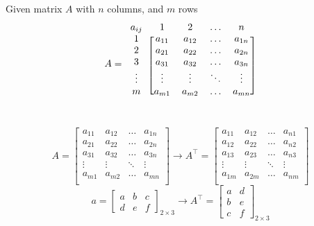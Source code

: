 Given matrix $A$ with $n$ columns, and $m$ rows
\[A=
\begin{blockarray}{ccccc}
a_{ij} & 1 & 2 & \dots  & n \\
\begin{block}{c[cccc]}
  1 & a_{11}  & a_{12}  & \dots & a_{1n}  \\
  2 & a_{21}  & a_{22}  & \dots & a_{2n}  \\
  3 & a_{31}  & a_{32}  & \dots & a_{3n}  \\
  \vdots & \vdots & \vdots & \ddots & \vdots \\
  m & a_{m1}  & a_{m2}  & \dots & a_{mn}  \\
\end{block}
\end{blockarray}
 \]
\\
\[A=
\begin{bmatrix}
   a_{11}  & a_{12}  & \dots & a_{1n}  \\
  a_{21}  & a_{22}  & \dots & a_{2n}  \\
   a_{31}  & a_{32}  & \dots & a_{3n}  \\
   \vdots & \vdots & \ddots & \vdots \\
   a_{m1}  & a_{m2}  & \dots & a_{mn}  \\
\end{bmatrix}
\longrightarrow A^\intercal = 
\begin{bmatrix}
   a_{11}  & a_{12}  & \dots & a_{n1}  \\
  a_{12}  & a_{22}  & \dots & a_{n2}  \\
   a_{13}  & a_{23}  & \dots & a_{n3}  \\
   \vdots & \vdots & \ddots & \vdots \\
   a_{1m}  & a_{2m}  & \dots & a_{nm}  \\
\end{bmatrix}
 \]
\[
a=
\begin{bmatrix}
    a & b & c \\
    d & e & f
\end{bmatrix}_{2\times 3}
\longrightarrow A^\intercal = 
\begin{bmatrix}
    a & d \\
    b & e \\
    c & f 
\end{bmatrix}_{2\times 3}
\]

